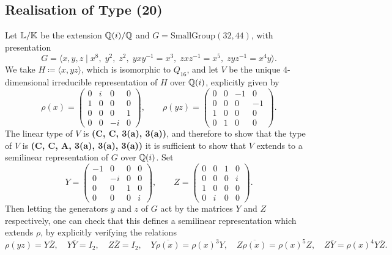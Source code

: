 \subsection{Realisation of Type (20)}

Let ${\mathbb L} / {\mathbb K}$ be the extension ${\mathbb Q}(i) / {\mathbb Q}$ and $G = \text{SmallGroup}(32,44)$, with presentation
\[
G = \langle x, y, z \mid x^8,\; y^2,\; z^2,\; yxy^{-1} = x^3,\; zxz^{-1} = x^5,\; zyz^{-1} = x^4 y\rangle.
\]
We take $H \coloneqq \langle x, yz \rangle$, which is isomorphic to $Q_{16}$, and let $V$ be the unique $4$-dimensional irreducible representation of $H$ over ${\mathbb Q}(i)$, explicitly given by
\[
\rho(x) = \begin{pmatrix}
    0 & i & 0 & 0 \\
1 & 0 & 0 & 0 \\
0 & 0 & 0 & 1 \\
0 & 0 & -i & 0
\end{pmatrix}, \qquad \rho(yz) = \begin{pmatrix}
0 & 0 & -1 & 0 \\
0 & 0 & 0 & -1 \\
1 & 0 & 0 & 0 \\
0 & 1 & 0 & 0
\end{pmatrix}.
\]
The linear type of $V$ is \textbf{(C, C, 3(a), 3(a))}, and therefore to show that the type of $V$ is \textbf{(C, C, A, 3(a), 3(a), 3(a))} it is sufficient to show that $V$ extends to a semilinear representation of $G$ over ${\mathbb Q}(i)$. Set
\[
Y = \begin{pmatrix}
-1 & 0 & 0 & 0 \\
0 & -i & 0 & 0 \\
0 & 0 & 1 & 0 \\
0 & 0 & 0 & i
\end{pmatrix}, \qquad Z = \begin{pmatrix}
0 & 0 & 1 & 0 \\
0 & 0 & 0 & i \\
1 & 0 & 0 & 0 \\
0 & i & 0 & 0
\end{pmatrix}.
\]
Then letting the generators $y$ and $z$ of $G$ act by the matrices $Y$ and $Z$ respectively, one can check that this defines a semilinear representation which extends $\rho$, by explicitly verifying the relations
\[
\rho(yz) = Y \overline{Z} , \quad Y \overline{Y} = I_2, \quad Z \overline{Z} = I_2, \quad Y \overline{\rho(x)} = \rho(x)^3 Y, \quad Z \overline{\rho(x)} = \rho(x)^5 Z, \quad Z \overline{Y} = \rho(x)^4 Y \overline{Z}. 
\]

